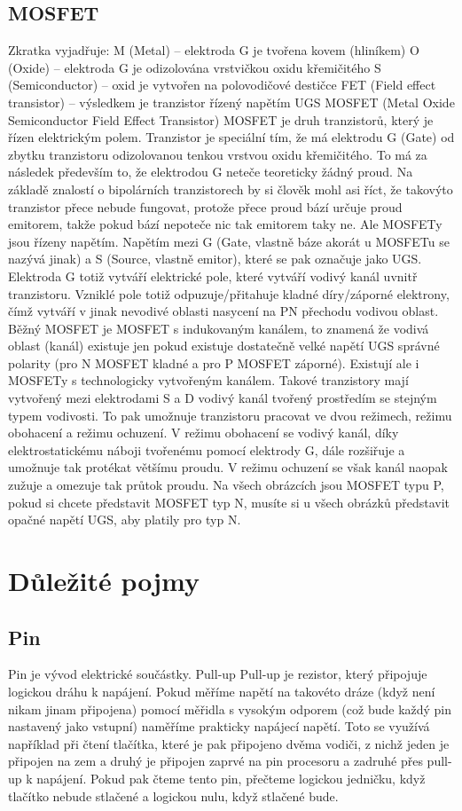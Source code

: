 \documentclass{template/socthesis}
\begin{document}
	\section*{MOSFET}
	Zkratka vyjadřuje:
	M (Metal) – elektroda G je tvořena kovem (hliníkem)
	O (Oxide) – elektroda G je odizolována vrstvičkou oxidu křemičitého
	S (Semiconductor) – oxid je vytvořen na polovodičové destičce
	FET (Field effect transistor) – výsledkem je tranzistor řízený napětím UGS
	MOSFET (Metal Oxide Semiconductor Field Effect Transistor)
	MOSFET je druh tranzistorů, který je řízen elektrickým polem. Tranzistor je speciální tím, že má elektrodu G (Gate) od zbytku tranzistoru odizolovanou tenkou vrstvou oxidu křemičitého. To má za následek především to, že elektrodou G neteče teoreticky žádný proud. Na základě znalostí o bipolárních tranzistorech by si člověk mohl asi říct, že takovýto tranzistor přece nebude fungovat, protože přece proud bází určuje proud emitorem, takže pokud bází nepoteče nic tak emitorem taky ne. Ale MOSFETy jsou řízeny napětím. Napětím mezi G (Gate, vlastně báze akorát u MOSFETu se nazývá jinak) a S (Source, vlastně emitor), které se pak označuje jako UGS.
	Elektroda G totiž vytváří elektrické pole, které vytváří vodivý kanál uvnitř tranzistoru. Vzniklé pole totiž odpuzuje/přitahuje kladné díry/záporné elektrony, čímž vytváří v jinak nevodivé oblasti nasycení na PN přechodu vodivou oblast.
	Běžný MOSFET je MOSFET s indukovaným kanálem, to znamená že vodivá oblast (kanál) existuje jen pokud existuje dostatečně velké napětí UGS správné polarity (pro N MOSFET kladné a pro P MOSFET záporné).  Existují ale i MOSFETy s technologicky vytvořeným kanálem. Takové tranzistory mají vytvořený mezi elektrodami S a D vodivý kanál tvořený prostředím se stejným typem vodivosti. To pak umožnuje tranzistoru pracovat ve dvou režimech, režimu obohacení a režimu ochuzení. V režimu obohacení se vodivý kanál, díky elektrostatickému náboji tvořenému pomocí elektrody G, dále rozšiřuje a umožnuje tak protékat většímu proudu. V režimu ochuzení se však kanál naopak zužuje a omezuje tak průtok proudu.
	Na všech obrázcích jsou MOSFET typu P, pokud si chcete představit MOSFET typ N, musíte si u všech obrázků představit opačné napětí UGS, aby platily pro typ N.
	
	
	\chapter*{Důležité pojmy}
	
	\section*{Pin}
	Pin je vývod elektrické součástky.
	Pull-up
	Pull-up je rezistor, který připojuje logickou dráhu k napájení. Pokud měříme napětí na takovéto dráze (když není nikam jinam připojena) pomocí měřidla s vysokým odporem (což bude každý pin nastavený jako vstupní) naměříme prakticky napájecí napětí. 
	Toto se využívá například při čtení tlačítka, které je pak připojeno dvěma vodiči, z nichž jeden je připojen na zem a druhý je připojen zaprvé na pin procesoru a zadruhé přes pull-up k napájení. 
	Pokud pak čteme tento pin, přečteme logickou jedničku, když tlačítko nebude stlačené a logickou nulu, když stlačené bude.
	
\end{document}
